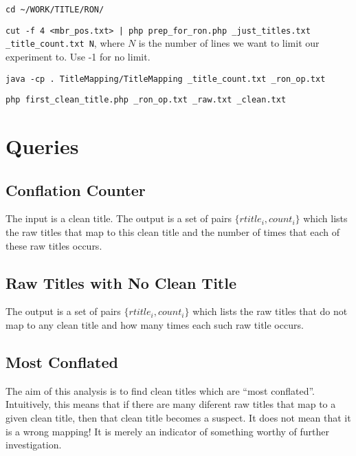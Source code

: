 \bi
\item \verb+cd ~/WORK/TITLE/RON/+
\item 
\verb+cut -f 4 <mbr_pos.txt> | php prep_for_ron.php _just_titles.txt _title_count.txt N+, 
  where \(N\) is the number of lines
we want to limit our experiment to. Use -1 for no limit.
\item \verb+java -cp . TitleMapping/TitleMapping _title_count.txt _ron_op.txt+
\item \verb+php first_clean_title.php _ron_op.txt _raw.txt _clean.txt+
\ei

\section{Queries}
\subsection{Conflation Counter}
\label{conflation_counter}

The input is a clean title. The output is a set of pairs \(\{rtitle_i,
count_i\}\) which lists the raw titles that map to this clean title
and the number of times that each of these raw titles occurs.

\subsection{Raw Titles with No Clean Title}
\label{no_clean_title}
The output is a set of pairs \(\{rtitle_i, count_i\}\) which lists the raw titles 
that do not map to any clean title and how many times each such raw
title occurs.

\subsection{Most Conflated}
\label{most_conflated}
The aim of this analysis is to find clean titles which are ``most
conflated''. Intuitively, this means that if there are many diferent raw
titles that map to a given clean title, then that clean title becomes a
suspect. It does not mean that it is a wrong mapping! It is merely an
indicator of something worthy of further investigation.


